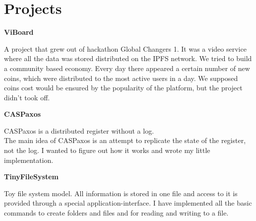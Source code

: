\documentclass[fontsize=11pt]{article}
\newcommand{\NewPart}[1]{\section*{#1}}
\newcommand{\ProgrammingEntry}[2]{
    \noindent \textbf{#1} \hfill      %

    \noindent \small #2 %
    \normalsize \par}
\begin{document}
\NewPart{Projects}{}
\ProgrammingEntry
{ViBoard}
{A project that grew out of hackathon Global Changers 1. It was a video service where all the data was stored distributed on the IPFS network. We tried to build a community based economy. Every day there appeared a certain number of new coins, which were distributed to the most active users in a day. We supposed coins cost would be ensured by the popularity of the platform, but the project didn't took off.}
\bigskip
\ProgrammingEntry
{CASPaxos}
{CASPaxos is a distributed register without a log. \\ The main idea of CASPaxos is an attempt to replicate the state of the register, not the log. I wanted to figure out how it works and wrote my little implementation.}
\bigskip
\ProgrammingEntry
{TinyFileSystem}
{Toy file system model. All information is stored in one file and access to it is provided through a special application-interface. I have implemented all the basic commands to create folders and files and for reading and writing to a file. }
\end{document}
